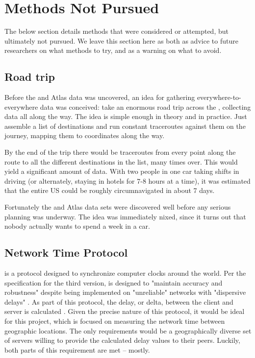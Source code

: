 \section{Methods Not Pursued}\label{sec:design_unused_methods}

The below section details methods that were considered or attempted, but ultimately not pursued. We leave this section here as both as advice to future researchers on what methods to try, and as a warning on what to avoid.

\subsection{Road trip}

Before the \caida and \ripe Atlas data was uncovered, an idea for gathering everywhere-to-everywhere data was conceived: take an enormous road trip across the \us, collecting data all along the way. The idea is simple enough in theory and in practice. Just assemble a list of destinations and run constant traceroutes against them on the journey, mapping them to \gps coordinates along the way.

By the end of the trip there would be traceroutes from every point along the route to all the different destinations in the list, many times over. This would yield a significant amount of data. With two people in one car taking shifts in driving (or alternately, staying in hotels for 7-8 hours at a time), it was estimated that the entire US could be roughly circumnavigated in about 7 days.

Fortunately the \caida and \ripe Atlas data sets were discovered well before any serious planning was underway. The idea was immediately nixed, since it turns out that nobody actually wants to spend a week in a car.

\subsection{Network Time Protocol}

\ntp is a protocol designed to synchronize computer clocks around the world. Per the specification for the third version, \ntp is designed to "maintain accuracy and robustness" despite being implemented on "unreliable" networks with "dispersive delays" \cite{rfc1305}. As part of this protocol, the delay, or delta, between the client and server is calculated \cite{rfc5905}. Given the precise nature of this protocol, it would be ideal for this project, which is focused on measuring the network time between geographic locations. The only requirements would be a geographically diverse set of \ntp servers willing to provide the calculated delay values to their peers. Luckily, both parts of this requirement are met -- mostly.

